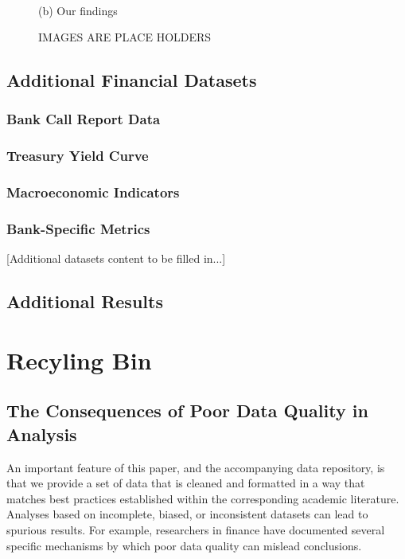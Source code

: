 \documentclass{article}
\begin{document}
\begin{appendices}
\begin{figure}[htbp]
\begin{minipage}[b]{0.48\textwidth}
    \\[1ex]
    {\small (b) Our findings}
  \end{minipage}
  \caption{IMAGES ARE PLACE HOLDERS}
  \label{fig:comparison-minipage}
\end{figure}
\FloatBarrier

\subsection{Additional Financial Datasets}
\label{sec:additional_datasets}


\subsubsection{Bank Call Report Data}

\subsubsection{Treasury Yield Curve}

\subsubsection{Macroeconomic Indicators}

\subsubsection{Bank-Specific Metrics}

[Additional datasets content to be filled in...]


\subsection{Additional Results}
\label{app:additional_results}

\section{Recyling Bin}


\subsection{The Consequences of Poor Data Quality in Analysis}
\label{sec:consequences_of_poor_data_quality}
An important feature of this paper, and the accompanying data repository, is that we provide a set of data that is cleaned and formatted in a way that matches best practices established within the corresponding academic literature. 
Analyses based on incomplete, biased, or inconsistent datasets can lead to spurious results. For example, researchers in finance have documented several specific mechanisms by which poor data quality can mislead conclusions.


\end{appendices}
\end{document}
